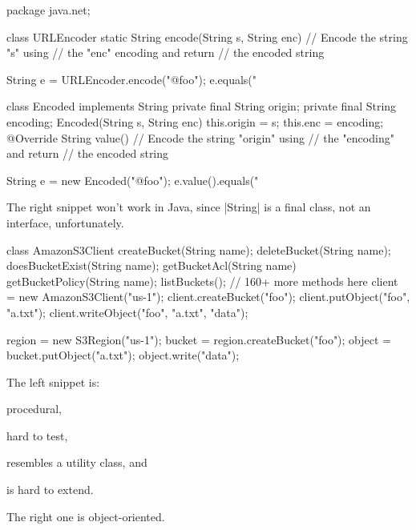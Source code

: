 \documentclass{article}
\begin{document}
\begin{pptWide}{2}
{\scriptsize\begin{ffcode}
package java.net;

class URLEncoder {
  static String encode(String s, String enc) {
    // Encode the string "s" using
    // the "enc" encoding and return
    // the encoded string
  }
}

String e = URLEncoder.encode("@foo");
e.equals("%
\end{ffcode}
}
\par\columnbreak\par
{\scriptsize\begin{ffcode}
class Encoded implements String {
  private final String origin;
  private final String encoding;
  Encoded(String s, String enc) {
    this.origin = s;
    this.enc = encoding;
  }
  @Override String value() {
    // Encode the string "origin" using
    // the "encoding" and return
    // the encoded string
  }
}

String e = new Encoded("@foo");
e.value().equals("%
\end{ffcode}
}
\end{pptWide}
\par
The right snippet won't work in Java, since |String| is a final class, not an interface, unfortunately.
\plush{}


\begin{pptWide}{2}
{\scriptsize\begin{ffcode}
class AmazonS3Client {
  createBucket(String name);
  deleteBucket(String name);
  doesBucketExist(String name);
  getBucketAcl(String name)
  getBucketPolicy(String name);
  listBuckets();
  // 160+ more methods here
}
client = new AmazonS3Client("us-1");
client.createBucket("foo");
client.putObject("foo", "a.txt");
client.writeObject("foo", "a.txt", "data");
\end{ffcode}
}
\par\columnbreak\par
{\scriptsize\begin{ffcode}
region = new S3Region("us-1");
bucket = region.createBucket("foo");
object = bucket.putObject("a.txt");
object.write("data");
\end{ffcode}
}
\end{pptWide}
\par
The left snippet is:
\begin{inparaenum}[1)]
\item procedural,
\item hard to test,
\item resembles a utility class,
and
\item is hard to extend.
\end{inparaenum}
The right one is object-oriented.
\plush{}
\end{document}
